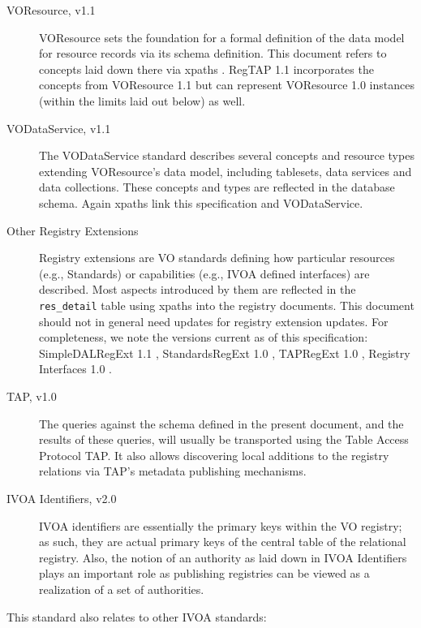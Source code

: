 \documentclass[11pt,a4paper]{ivoa}
\newcommand{\rtent}[1]{\texttt{\color{rtcolor} #1}}
\begin{document}
\begin{description}
\item[VOResource, v1.1 \citep{2018ivoa.spec.0625P}] VOResource sets the foundation for a formal definition of the data
model for resource records via its schema definition.  This document
refers to concepts laid down there via xpaths \citep{std:XPATH}.  RegTAP
1.1 incorporates the concepts from VOResource 1.1 but can represent
VOResource 1.0 instances (within the limits laid out below) as well.
\item[VODataService, v1.1 \citep{std:VODS11}] The VODataService standard 
describes several concepts and resource types extending 
VOResource's data model, including
tablesets, data services and data
collections.  These concepts and types are reflected in the database
schema.  Again xpaths link this specification and VODataService.
\item[Other Registry Extensions]Registry extensions are VO standards
defining how particular resources (e.g., Standards) or capabilities
(e.g., IVOA defined interfaces) are described.  Most aspects
introduced by them are reflected in the \rtent{res\_detail} table using
xpaths into the registry documents.
This document should not in general need updates
for registry extension updates.  For completeness, we note the
versions current as of this specification: SimpleDALRegExt 1.1
\citep{2017ivoa.spec.0530P},
StandardsRegExt 1.0 \citep{std:STDREGEXT}, TAPRegExt 1.0
\citep{std:TAPREGEXT}, Registry Interfaces 1.0
\citep{std:RI1}.
\item[TAP, v1.0 \citep{std:TAP}]The queries against the schema defined in the present document, and the results of
these queries, will usually be transported using the Table Access
Protocol TAP.  It also allows discovering
local additions to the registry relations via TAP's metadata publishing
mechanisms.
\item[IVOA Identifiers, v2.0 \citep{2016ivoa.spec.0523D}]IVOA identifiers are
essentially the primary keys within the VO
registry; as such, they are actual primary keys of the central table of
the relational registry. Also, the notion of an authority as laid down
in IVOA Identifiers plays an important role as publishing registries can
be viewed as a realization of a set of authorities.

\end{description}

This standard also relates to other IVOA standards:
\end{document}
